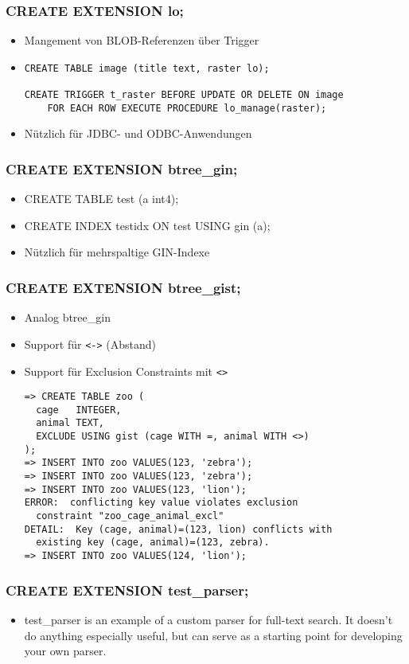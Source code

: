 \documentclass[utf8,hyperref={pdftex,colorlinks,linkcolor=black,citecolor=black,urlcolor=black,filecolor=black,plainpages=false},xcolor=table,hyperref]{beamer}
\begin{document}
\begin{frame}[containsverbatim]
	\frametitle{CREATE EXTENSION lo;}
	\begin{itemize}
		\item Mangement von BLOB-Referenzen über Trigger
		\item 
			\begin{verbatim}
CREATE TABLE image (title text, raster lo);

CREATE TRIGGER t_raster BEFORE UPDATE OR DELETE ON image
    FOR EACH ROW EXECUTE PROCEDURE lo_manage(raster);
    \end{verbatim}
		\item Nützlich für JDBC- und ODBC-Anwendungen
	\end{itemize}
\end{frame}

\begin{frame}[containsverbatim]
	\frametitle{CREATE EXTENSION btree_gin;}
	\begin{itemize}
		\item CREATE TABLE test (a int4);
		\item CREATE INDEX testidx ON test USING gin (a);
		\item Nützlich für mehrspaltige GIN-Indexe
	\end{itemize}
\end{frame}

\begin{frame}[containsverbatim]
	\frametitle{CREATE EXTENSION btree_gist;}
	\begin{itemize}
		\item Analog btree_gin
		\item Support für \verb|<->| (Abstand)
		\item Support für Exclusion Constraints mit \verb|<>|
			\begin{verbatim}
=> CREATE TABLE zoo (
  cage   INTEGER,
  animal TEXT,
  EXCLUDE USING gist (cage WITH =, animal WITH <>)
);
=> INSERT INTO zoo VALUES(123, 'zebra');
=> INSERT INTO zoo VALUES(123, 'zebra');
=> INSERT INTO zoo VALUES(123, 'lion');
ERROR:  conflicting key value violates exclusion
  constraint "zoo_cage_animal_excl"
DETAIL:  Key (cage, animal)=(123, lion) conflicts with
  existing key (cage, animal)=(123, zebra).
=> INSERT INTO zoo VALUES(124, 'lion');
\end{verbatim}
\end{itemize}
\end{frame}

\begin{frame}[containsverbatim]
	\frametitle{CREATE EXTENSION test_parser;}
	\begin{itemize}
		\item test_parser is an example of a custom parser for full-text search. It doesn't do anything especially useful, but can serve as a starting point for developing your own parser. 
	\end{itemize} 
\end{frame}
\end{document}
